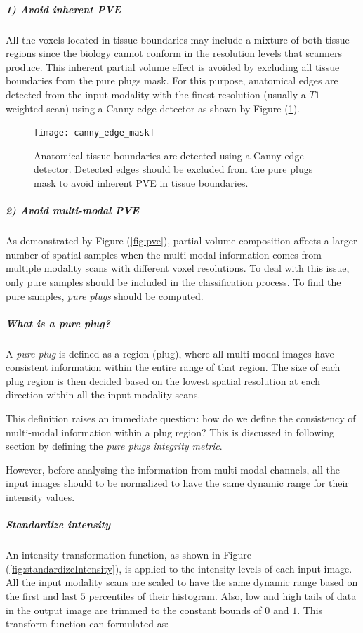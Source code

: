 \subparagraph*{1) Avoid inherent PVE}
All the voxels located in tissue boundaries may include a mixture of both tissue regions since the biology cannot conform in the resolution levels that scanners produce. This inherent partial volume effect is avoided by excluding all tissue boundaries from the pure plugs mask. For this purpose, anatomical edges are detected from the input modality with the finest resolution (usually a $T1$-weighted scan) using a Canny edge detector \cite{canny1986} as shown by Figure (\ref{fig:canny_edge_mask}).

\begin{figure}
\centering
\texttt{[image: canny\_edge\_mask]}\
\centering
\caption{Anatomical tissue boundaries are detected using a Canny edge detector. Detected edges should be excluded from the pure plugs mask to avoid inherent PVE in tissue boundaries.} 
\label{fig:canny_edge_mask}
\end{figure}

\subparagraph*{2) Avoid multi-modal PVE}
As demonstrated by Figure (\ref{fig:pve}), partial  volume  composition  affects  a  larger  number  of  spatial  samples  when  the  multi-modal  information comes from multiple modality scans with different voxel resolutions. 
To deal with this issue, only pure samples should be included in the classification process. To find the pure samples, \textit{pure plugs} should be computed.

\subparagraph*{What is a pure plug?}
A \textit{pure plug} is defined as a region (plug), where all multi-modal images have consistent information within the entire range of that region. The size of each plug region is then decided based on the lowest spatial resolution at each direction within all the input modality scans.

This definition raises an immediate question: how do we define the consistency of multi-modal information within a plug region? This is discussed in following section by defining the \textit{pure plugs integrity metric}.

However, before analysing the information from multi-modal channels, all the input images should to be normalized to have the same dynamic range for their intensity values.

\subparagraph*{Standardize intensity}

An intensity transformation function, as shown in Figure (\ref{fig:standardizeIntensity}), is applied to the intensity levels of each input image. All the input modality scans are scaled to have the same dynamic range based on the first and last $5$ percentiles of their histogram. Also, low and high tails of data in the output image are trimmed to the constant bounds of $0$ and $1$. This transform function can formulated as:

